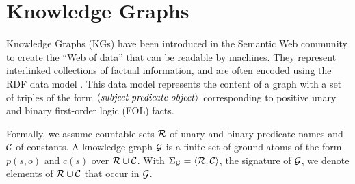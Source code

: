 \section{Knowledge Graphs}
\label{sec:kgs}

Knowledge Graphs (KGs) have been introduced in the Semantic Web community to create the ``Web of data'' that can be readable by machines. They represent interlinked collections of factual information, and  are often encoded using the RDF data model \cite{rdf2004}. This data model represents the content of a graph with a set of triples of the form $\langle\mathit{subject\;predicate\;object}\rangle$ corresponding to positive unary and binary first-order logic (FOL) facts.  %

Formally, we assume countable sets $\mathcal{R}$ of unary and binary predicate names and $\mathcal{C}$ of constants. A knowledge graph $\mathcal{G}$ is a finite set of ground atoms of the form $p(s,o)$ and $c(s)$ over $\mathcal{R} \cup \mathcal{C}$. With $\Sigma_{\mathcal{G}}=\langle\mathcal{R},\mathcal{C}\rangle$, the signature of $\mathcal{G}$, we denote elements of $\mathcal{R} \cup \mathcal{C}$ that occur in $\mathcal{G}$.

